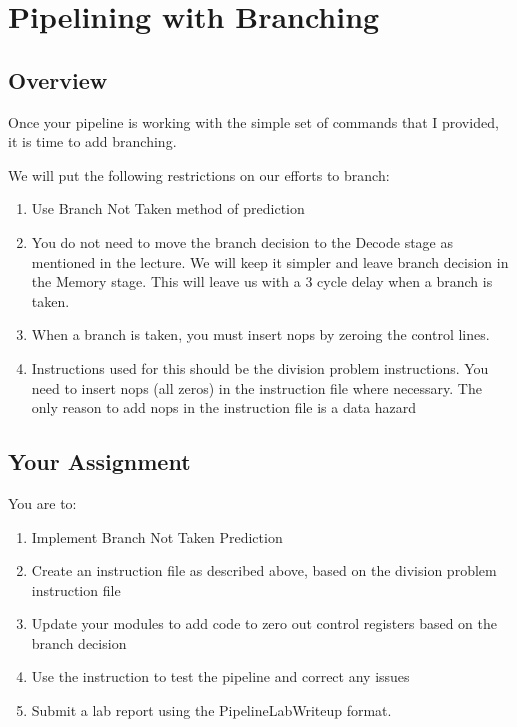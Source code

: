 \chapter{Pipelining with Branching}


\section{Overview}
Once your pipeline is working with the simple set of commands that I provided, it is time to add branching.  

We will put the following restrictions on our efforts to branch:
\begin{enumerate}
	\item Use Branch Not Taken method of prediction
	\item You do not need to move the branch decision to the Decode stage as mentioned in the lecture.  We will keep it simpler and leave branch decision in the Memory stage.  This will leave us with a 3 cycle delay when a branch is taken.
	\item When a branch is taken, you must insert nops by zeroing the control lines.
	\item Instructions used for this should be the division problem instructions.  You need to insert nops (all zeros) in the instruction file where necessary.  The only reason to add nops in the instruction file is a data hazard
\end{enumerate}  

\section{Your Assignment}

You are to:
\begin{enumerate}
\item Implement Branch Not Taken Prediction
\item Create an instruction file as described above, based on the division problem instruction file
\item Update your modules to add code to zero out control registers based on the branch decision
\item Use the instruction to test the pipeline and correct any issues
\item Submit a lab report using the PipelineLabWriteup format.
\end{enumerate} 